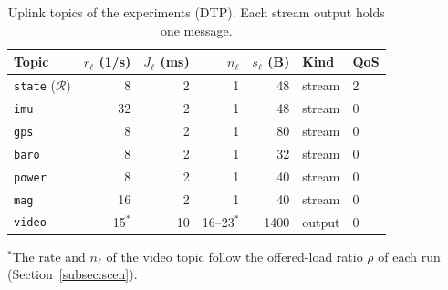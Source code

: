 
\begin{table}[t]
\caption{Uplink topics of the experiments (DTP). Each stream output holds one message.}\label{tab:topics}
\centering\footnotesize
\begin{tabular}{@{}lrrrrll@{}}
\toprule
Topic & $r_\ell$ (1/s) & $J_\ell$ (ms) & $n_\ell$ & $s_\ell$ (B) & Kind & QoS \\
\midrule
\texttt{state} ($\mathcal{R}$) & 8 & 2 & 1 & 48 & stream & 2 \\
\texttt{imu} & 32 & 2 & 1 & 48 & stream & 0 \\
\texttt{gps} & 8 & 2 & 1 & 80 & stream & 0 \\
\texttt{baro} & 8 & 2 & 1 & 32 & stream & 0 \\
\texttt{power} & 8 & 2 & 1 & 40 & stream & 0 \\
\texttt{mag} & 16 & 2 & 1 & 40 & stream & 0 \\
\texttt{video} & 15$^{\ast}$ & 10 & 16--23$^{\ast}$ & 1400 & output & 0 \\
\bottomrule
\end{tabular}

\smallskip
\raggedright\footnotesize $^{\ast}$The rate and $n_\ell$ of the video topic follow the offered-load ratio $\rho$ of each run (Section~\ref{subsec:scen}).
\end{table}

